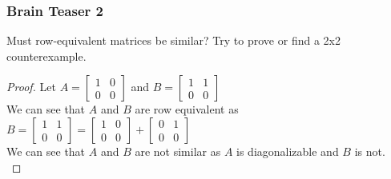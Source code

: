\documentclass[answers,12pt,addpoints]{exam}
\begin{document}
\subsubsection{Brain Teaser 2}
Must row-equivalent matrices be similar?  Try to prove or find a 2x2 counterexample.\\
\begin{proof}
    Let $A = \begin{bmatrix} 1 & 0 \\ 0 & 0 \end{bmatrix}$ and $B = \begin{bmatrix} 1 & 1 \\ 0 & 0 \end{bmatrix}$\\
    We can see that $A$ and $B$ are row equivalent as $B = \begin{bmatrix} 1 & 1 \\ 0 & 0 \end{bmatrix} = \begin{bmatrix} 1 & 0 \\ 0 & 0 \end{bmatrix} + \begin{bmatrix} 0 & 1 \\ 0 & 0 \end{bmatrix}$\\
    We can see that $A$ and $B$ are not similar as $A$ is diagonalizable and $B$ is not.\\
\end{proof}
\end{document}
